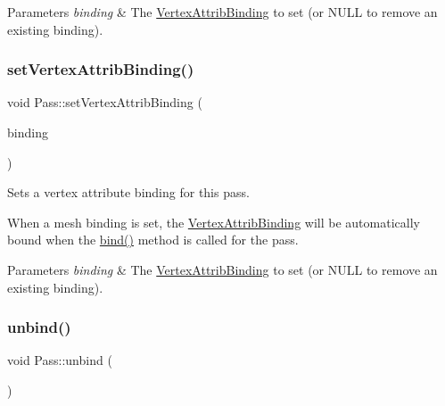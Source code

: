 \begin{DoxyParams}{Parameters}
{\em binding} & The \hyperlink{classVertexAttribBinding}{Vertex\+Attrib\+Binding} to set (or N\+U\+LL to remove an existing binding). \\
\hline
\end{DoxyParams}
\mbox{\label{classPass_a611219b345c8a97b89d13fa1589fe87c}} 
\subsubsection{\texorpdfstring{set\+Vertex\+Attrib\+Binding()}{setVertexAttribBinding()}\hspace{0.1cm}{\footnotesize\ttfamily [2/2]}}
{\footnotesize\ttfamily void Pass\+::set\+Vertex\+Attrib\+Binding (\begin{DoxyParamCaption}\item[{\hyperlink{classVertexAttribBinding}{Vertex\+Attrib\+Binding} $\ast$}]{binding }\end{DoxyParamCaption})}

Sets a vertex attribute binding for this pass.

When a mesh binding is set, the \hyperlink{classVertexAttribBinding}{Vertex\+Attrib\+Binding} will be automatically bound when the \hyperlink{classPass_a61f3c6e7b46c51555c43d97619a13630}{bind()} method is called for the pass.


\begin{DoxyParams}{Parameters}
{\em binding} & The \hyperlink{classVertexAttribBinding}{Vertex\+Attrib\+Binding} to set (or N\+U\+LL to remove an existing binding). \\
\hline
\end{DoxyParams}
\mbox{\label{classPass_a50df7eb7f9ce52d7c93ca5073f675f32}} 
\subsubsection{\texorpdfstring{unbind()}{unbind()}\hspace{0.1cm}{\footnotesize\ttfamily [1/2]}}
{\footnotesize\ttfamily void Pass\+::unbind (\begin{DoxyParamCaption}{ }\end{DoxyParamCaption})}

